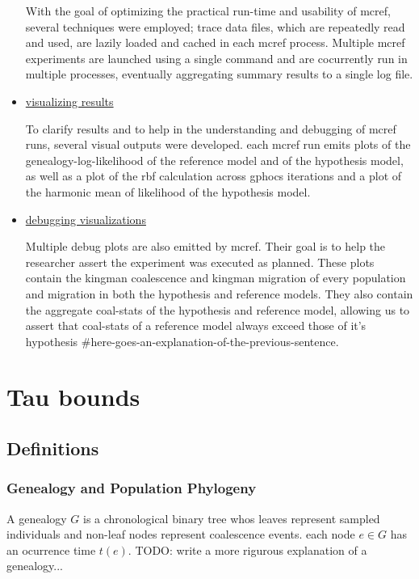 \documentclass[11pt]{article}
\begin{document}
\begin{itemize}
With the goal of optimizing the practical run-time and usability of mcref, several techniques were employed; trace data files, which are repeatedly read and used, are lazily loaded and cached in each mcref process. Multiple mcref experiments are launched using a single command and are cocurrently run in multiple processes, eventually aggregating summary results to a single log file. 

\item \underline{visualizing results}

To clarify results and to help in the understanding and debugging of mcref runs, several visual outputs were developed. each mcref run emits plots of the genealogy-log-likelihood of the reference model and of the hypothesis model, as well as a plot of the rbf calculation across gphocs iterations and a plot of the harmonic mean of likelihood of the hypothesis model.

\item \underline{debugging visualizations}

Multiple debug plots are also emitted by mcref. Their goal is to help the researcher assert the experiment was executed as planned. These plots contain the kingman coalescence and kingman migration of every population and migration in both the hypothesis and reference models. They also contain the aggregate coal-stats of the hypothesis and reference model, allowing us to assert that coal-stats of a reference model always exceed those of it's hypothesis \#here-goes-an-explanation-of-the-previous-sentence. 
\end{itemize}

\section{Tau bounds}

\subsection{Definitions}

\subsubsection{Genealogy and Population Phylogeny}
A genealogy $G$ is a chronological binary tree whos leaves represent sampled individuals and non-leaf nodes represent coalescence events. each node $e \in G$ has an ocurrence time $t(e)$. TODO: write a more rigurous explanation of a genealogy...
\end{document}
